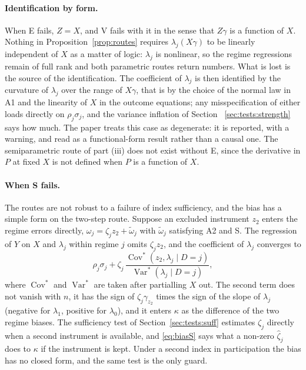 \documentclass[11pt,a4paper]{article}
\theoremstyle{plain}
\theoremstyle{definition}
\theoremstyle{remark}
\newcommand{\Cov}{\operatorname{Cov}}
\newcommand{\Var}{\operatorname{Var}}
\newcommand{\1}{\mathbf{1}}
\begin{document}
\paragraph{Identification by form.}
When E fails, $Z=X$, and V fails with it in the sense that $Z\gamma$ is a
function of $X$. Nothing in Proposition~\ref{prop:routes} requires
$\lambda_j(X\gamma)$ to be linearly independent of $X$ as a matter of
logic: $\lambda_j$ is nonlinear, so the regime regressions remain of full
rank and both parametric routes return numbers. What is lost is the
source of the identification. The coefficient of $\lambda_j$ is then
identified by the curvature of $\lambda_j$ over the range of $X\gamma$,
that is by the choice of the normal law in A1 and the linearity of $X$
in the outcome equations; any misspecification of either loads directly
on $\rho_j\sigma_j$, and the variance inflation of Section~%
\ref{sec:tests:strength} says how much. The paper treats this case as
degenerate: it is reported, with a warning, and read as a functional-form
result rather than a causal one. The semiparametric route of part (iii)
does not exist without E, since the derivative in $P$ at fixed $X$ is not
defined when $P$ is a function of $X$.

\paragraph{When S fails.}
The routes are not robust to a failure of index sufficiency, and the bias
has a simple form on the two-step route. Suppose an excluded instrument
$z_2$ enters the regime errors directly, $\omega_j=\zeta_jz_2+\tilde\omega_j$
with $\tilde\omega_j$ satisfying A2 and S. The regression of $Y$ on $X$
and $\lambda_j$ within regime $j$ omits $\zeta_jz_2$, and the coefficient
of $\lambda_j$ converges to
\begin{equation}\label{eq:biasS}
\rho_j\sigma_j+\zeta_j\,\frac{\Cov^{*}(z_2,\lambda_j\mid D=j)}{\Var^{*}(\lambda_j\mid D=j)},
\end{equation}
where $\Cov^*$ and $\Var^*$ are taken after partialling $X$ out. The
second term does not vanish with $n$, it has the sign of
$\zeta_j\gamma_{z_2}$ times the sign of the slope of $\lambda_j$
(negative for $\lambda_1$, positive for $\lambda_0$), and it enters
$\kappa$ as the difference of the two regime biases. The sufficiency
test of Section~\ref{sec:tests:suff} estimates $\zeta_j$ directly when a
second instrument is available, and \eqref{eq:biasS} says what a
non-zero $\hat\zeta_j$ does to $\kappa$ if the instrument is kept. Under
a second index in participation the bias has no closed form, and the
same test is the only guard.
\end{document}

